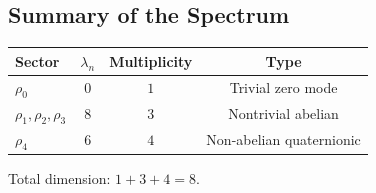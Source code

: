 \subsection{Summary of the Spectrum}
  \label{subsec:summary-of-spectrum}

  \begin{center}
    \begin{tabular}{lccc}
      \hline
      Sector                   & $\lambda_n$ & Multiplicity & Type                     \\
      \hline
      $\rho_0$                 & $0$         & $1$          & Trivial zero mode        \\
      $\rho_1, \rho_2, \rho_3$ & $8$         & $3$          & Nontrivial abelian       \\
      $\rho_4$                 & $6$         & $4$          & Non-abelian quaternionic \\
      \hline
    \end{tabular}
  \end{center}
  Total dimension: $1 + 3 + 4 = 8$.
